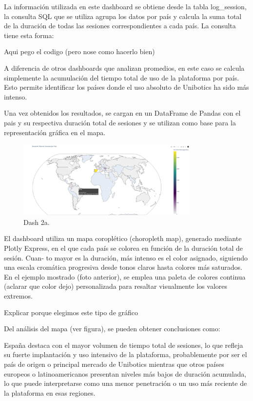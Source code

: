 \documentclass[a4paper, 12pt]{book}
\begin{document}
La información utilizada en este dashboard se obtiene desde la tabla log\_session, la consulta SQL que se utiliza agrupa los datos por país y calcula la suma total de la duración de todas las sesiones correspondientes a cada país. La consulta tiene esta forma:

Aqui pego el codigo (pero nose como hacerlo bien)

A diferencia de otros dashboards que analizan promedios, en este caso se calcula simplemente la acumulación del tiempo total de uso de la plataforma por país. Esto permite identificar los países donde el uso absoluto de Unibotics ha sido más intenso.

Una vez obtenidos los resultados, se cargan en un DataFrame de Pandas con el pais y su respectiva duración total de sesiones y se utilizan como base para la representación gráfica en el mapa.

\begin{figure}
  \centering
  \includegraphics[width=9cm, keepaspectratio]{img/2a.png}
  \caption{Dash 2a.}\label{fig:2a}
\end{figure}


El dashboard utiliza un mapa coroplético (choropleth map), generado mediante Plotly
Express, en el que cada país se colorea en función de la duración total de sesión. Cuan-
to mayor es la duración, más intenso es el color asignado, siguiendo una escala cromática
progresiva desde tonos claros hasta colores más saturados. En el ejemplo mostrado (foto
anterior), se emplea una paleta de colores continua (aclarar que color dejo) personalizada
para resaltar visualmente los valores extremos.

Explicar porque elegimos este tipo de gráfico

Del análisis del mapa (ver figura), se pueden obtener conclusiones como:

España destaca con el mayor volumen de tiempo total de sesiones, lo que refleja su fuerte implantación y uso intensivo de la plataforma, probablemente por ser el país de origen o principal mercado de Unibotics mientras que otros países europeos o latinoamericanos presentan niveles más bajos de duración acumulada, lo que puede interpretarse como una menor penetración o un uso más reciente de la plataforma en esas regiones.
\end{document}

